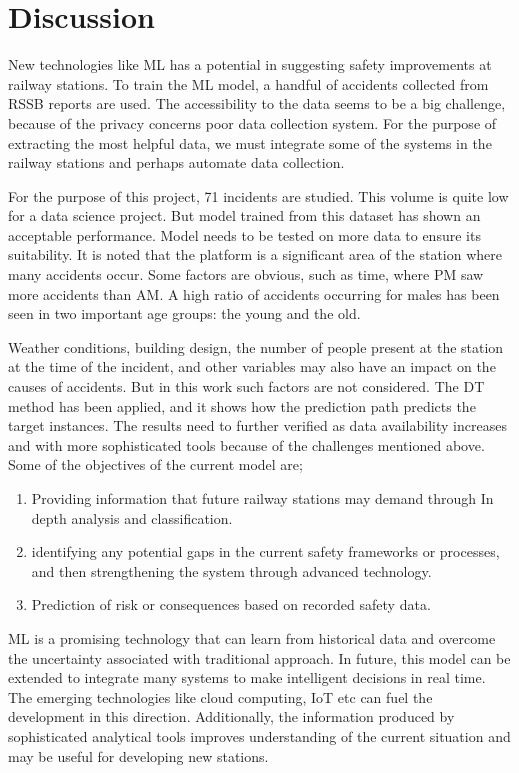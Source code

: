 \section{Discussion}
New technologies like ML has a potential in suggesting safety improvements at railway stations. To train the ML model, a handful of accidents collected from RSSB reports are used. The accessibility to the data seems to be a big challenge, because of the privacy concerns poor data collection system. For the purpose of extracting the most helpful data, we must integrate some of the systems in the railway stations and perhaps automate data collection.

For the purpose of this project, 71 incidents are studied. This volume is quite low for a data science project. But model trained from this dataset has shown an acceptable performance. Model needs to be tested on more data to ensure its suitability. It is noted that the platform is a significant area of the station where many accidents occur. Some factors are obvious, such as time, where PM saw more accidents than AM. A high ratio of accidents occurring for males has been seen in two important age groups: the young and the old. 

Weather conditions, building design, the number of people present at the station at the time of the incident, and other variables may also have an impact on the causes of accidents. But in this work such factors are not considered. 
The DT method has been applied, and it shows how the prediction path predicts the target instances. The results need to further verified as data availability increases and with more sophisticated tools because of the challenges mentioned above. Some of the objectives of the current model are;
\begin{enumerate}
    \item Providing information that future railway stations may demand through In depth analysis and classification.
    \item  identifying any potential gaps in the current safety frameworks or processes, and then strengthening the system through advanced technology.
    \item Prediction of risk or consequences based on recorded safety data.  
\end{enumerate}

ML is a promising technology that can learn from historical data and overcome the uncertainty associated with traditional approach. In future, this model can be extended to integrate many systems to make intelligent decisions in real time. The emerging technologies like cloud computing, IoT etc can fuel the development in this direction. Additionally, the information produced by sophisticated analytical tools improves understanding of the current situation and may be useful for developing new stations.

